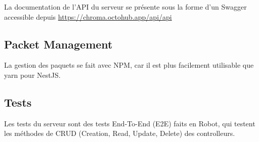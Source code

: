 La documentation de l’API du serveur se présente sous la forme d’un Swagger accessible depuis \url{https://chroma.octohub.app/api/api}

\subsection*{Packet Management}
La gestion des paquets se fait avec NPM, car il est plus facilement utilisable que yarn pour NestJS.

\subsection*{Tests}
Les tests du serveur sont des tests End-To-End (E2E) faits en Robot, qui testent les méthodes de CRUD (Creation, Read, Update, Delete) des controlleurs. 
